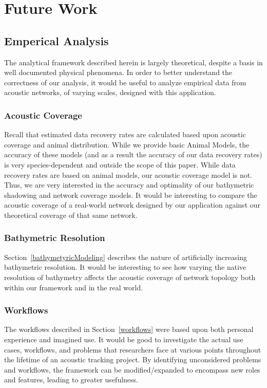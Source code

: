\section{Future Work}
\subsection{Emperical Analysis}
The analytical framework described herein is largely theoretical, despite a basis in well documented physical phenomena.  In order to better understand the correctness of our analysis, it would be useful to analyze empirical data from acoustic networks, of varying scales, designed with this application.

\subsubsection{Acoustic Coverage}
Recall that estimated data recovery rates are calculated based upon acoustic coverage and animal distribution.  While we provide basic Animal Models, the accuracy of these models (and as a result the accuracy of our data recovery rates) is very species-dependent and outside the scope of this paper.  While data recovery rates are based on animal models, our acoustic coverage model is not.  Thus, we are very interested in the accuracy and optimality of our bathymetric shadowing and network coverage models.  It would be interesting to compare the acoustic coverage of a real-world network designed by our application against our theoretical coverage of that same network.

\subsubsection{Bathymetric Resolution}
Section~\ref{bathymetyricModeling} describes the nature of artificially increasing bathymetric resolution.  It would be interesting to see how varying the native resolution of bathymetry affects the acoustic coverage of network topology both within our framework and in the real world.

\subsubsection{Workflows}
The workflows described in Section~\ref{workflows} were based upon both personal experience and imagined use.  It would be good to investigate the actual use cases, workflows, and problems that researchers face at various points throughout the lifetime of an acoustic tracking project.  By identifying unconsidered problems and workflows, the framework can be modified/expanded to encompass new roles and features, leading to greater usefulness.

